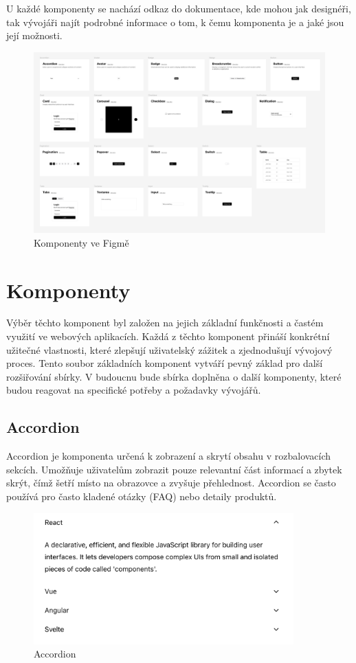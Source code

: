 U každé komponenty se nachází odkaz do dokumentace, kde mohou jak designéři, tak vývojáři najít podrobné informace o tom, k čemu komponenta je a jaké jsou její možnosti.

\begin{figure}[H]
  \includegraphics[width=\textwidth]{images/figma-kit}
  \caption{Komponenty ve Figmě} \label{picture:figma-kit}
\end{figure}

\section{Komponenty}
Výběr těchto komponent byl založen na jejich základní funkčnosti a častém využití ve webových aplikacích. Každá z těchto komponent přináší konkrétní užitečné vlastnosti, které zlepšují uživatelský zážitek a zjednodušují vývojový proces. Tento soubor základních komponent vytváří pevný základ pro další rozšiřování sbírky. V budoucnu bude sbírka doplněna o další komponenty, které budou reagovat na specifické potřeby a požadavky vývojářů.

\subsection{Accordion}
Accordion je komponenta určená k zobrazení a skrytí obsahu v rozbalovacích sekcích. Umožňuje uživatelům zobrazit pouze relevantní část informací a zbytek skrýt, čímž šetří místo na obrazovce a zvyšuje přehlednost. Accordion se často používá pro často kladené otázky (FAQ) nebo detaily produktů.

\begin{figure}[H]
  \centering
  \includegraphics[width=10cm]{images/accordion}
  \captionsetup{justification=centering,margin=2cm}
  \caption{Accordion} \label{picture:accordion}
\end{figure}

